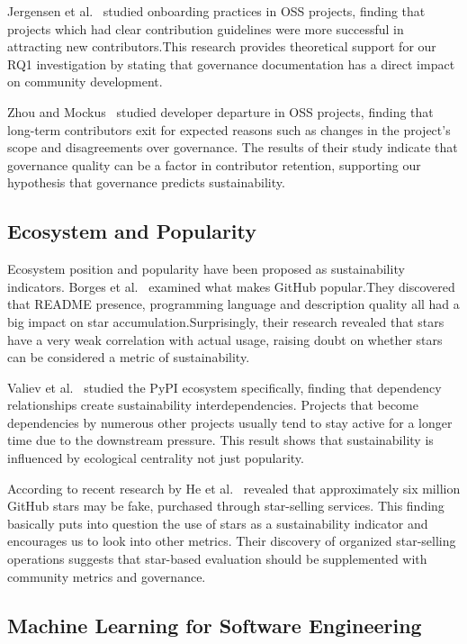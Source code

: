 \documentclass[conference]{IEEEtran}
\begin{document}
Jergensen et al.~\cite{jergensen2011} studied onboarding practices in OSS projects, finding that projects which had clear contribution guidelines were more successful in attracting new contributors.This research provides theoretical support for our RQ1 investigation by stating that governance documentation has a direct impact on community development.

Zhou and Mockus~\cite{zhou2012} studied developer departure in OSS projects, finding that long-term contributors exit for expected reasons such as changes in the project's scope and disagreements over governance. The results of their study indicate that governance quality can be a factor in contributor retention, supporting our hypothesis that governance predicts sustainability.

\subsection{Ecosystem and Popularity}

Ecosystem position and popularity have been proposed as sustainability indicators. Borges et al.~\cite{borges2016} examined what makes GitHub popular.They discovered that README presence, programming language and description quality all had a big impact on star accumulation.Surprisingly, their research revealed that stars have a very weak correlation with actual usage, raising doubt on whether stars can be considered a metric of sustainability.

Valiev et al.~\cite{valiev2018} studied the PyPI ecosystem specifically, finding that dependency relationships create sustainability interdependencies. Projects that become dependencies by numerous other projects usually tend to stay active for a longer time due to the downstream pressure. This result shows that sustainability is influenced by ecological centrality not just popularity.

According to recent research by He et al.~\cite{he2024} revealed that approximately six million GitHub stars may be fake, purchased through star-selling services. This finding basically puts into question the use of stars as a sustainability indicator and encourages us to look into other metrics. Their discovery of organized star-selling operations suggests that star-based evaluation should be supplemented with community metrics and governance.

\subsection{Machine Learning for Software Engineering}
\end{document}
